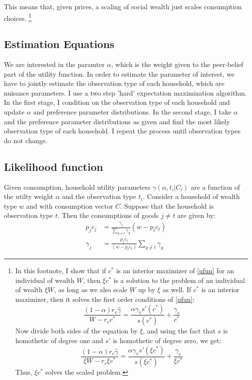 \documentclass[12pt]{article}
\begin{document}
This means that, given prices, a scaling of social wealth just scales consumption choices.
\footnote{
In this footnote, I show that if $c^*$ is an interior maximizer of \eqref{ufun} for an individual of wealth $W$, then $\xi c^*$ is a solution to the  problem of an individual of wealth $\xi W$, as long as we also scale $\underbar{W}$ up by $\xi$ as well.
If $c^*$ is an interior maximizer, then it solves the first order conditions of \eqref{ufun}:
\[
\frac{(1-\alpha)r_v \hat{\gamma}}{W-r_v c^*} = \frac{\alpha \gamma_v s'(c^*)}{s(c^*)} + \frac{\gamma_v}{c^*}
\]
Now divide both sides of the equation by $\xi$, and using the fact that $s$ is homothetic of degree one and $s'$ is homothetic of degree zero, we get:
\[
\frac{(1-\alpha)r_v \hat{\gamma}}{\xi W-r_v \xi c^*} = \frac{\alpha \gamma_v s'(\xi c^*)}{s(\xi c^*)} + \frac{\gamma_v}{\xi c^*}
\]
Thus, $\xi c^*$ solves the scaled problem.
}
\subsection{Estimation Equations}
We are interested in the paramter $\alpha$, which is the weight given to the peer-belief part of the utility function.  In order to estimate the parameter of interest, we have to jointly estimate the observation type of each household, which are nuisance parameters.  I use a two step 'hard' expectation maximization algorithm.  In the first stage, I condition on the observation type of each household and update $\alpha$ and preference parameter distributions.  In the second stage, I take $\alpha$ and the preference parameter distributions as given and find the most likely observation type of each household.  I repeat the process until observation types do not change.

\subsection{Likelihood function}

Given consumption, household utility parameters $\gamma(\alpha,t_i|C_i)$ are a function of the utilty weight $\alpha$ and the observation type $t_i$.  Consider a household of wealth type $w$ and with consumption vector $C$.  Suppose that the household is observation type $t$.
Then the consumptions of goods $j\neq t$ are given by:
\begin{align}
	\label{eq:sgd}
	p_jc_j &= \frac{\gamma_j}{\sum_{g\neq t}\gamma_g}  \left(w-  p_t c_t\right)\\
	\label{eq:sgdsol}
	\gamma_j &= \frac{p_j c_j}{\left(w- p_t c_t\right)} \sum_{g\neq t}\gamma_g  
\end{align}
\end{document}
